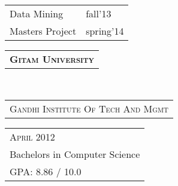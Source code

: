 \documentclass[10pt,a4paper,oneside]{article}
\begin{document}
\begin{minipage}[t]{0.33\textwidth}
\begin{adjustwidth}{7pt}{0pt}
\begin{tabular}{ll}
                { \footnotesize Data Mining } & {\footnotesize fall'13}\\
                { \footnotesize Masters Project } & {\footnotesize spring'14}
            \end{tabular}
        \end{adjustwidth}
        \vspace{10pt}
        \begin{tabular}{c}
            \textbf{\normalsize  G\textsc{itam} U\textsc{niversity}}
        \end{tabular}\\
        \textcolor{light-gray}{
            \begin{tabular}{l}
                {\small G\textsc{andhi} I\textsc{nstitute} O\textsc{f} T\textsc{ech} A\textsc{nd} M\textsc{gmt}}
            \end{tabular}
        } 
        \begin{tabular}{l}
            {\small A\textsc{pril} 2012}\\
            {\small Bachelors in Computer Science }\\
            {\small GPA: 8.86 / 10.0}
            \vspace{10pt}
        \end{tabular}\\
        \begin{comment}
        \textcolor{light-gray}{\textbf{\large S\textsc{kills}}}
        \vspace{-3pt}\\
        {\footnotesize
        \begin{tabular}{ll}
            \begin{tabular}{llll}\ &$\bullet$$\bullet$$\bullet$$\bullet$&$\bullet$$\bullet$$\bullet$$\bullet$&$\bullet$$\bullet$\\{\small
    \textbf{Languages}}&Java&Python&C++\end{tabular}\\[-0.2cm]
        \begin{tabular}{lll}\ &$\bullet$$\bullet$$\bullet$&$\bullet$$\bullet$\\{\small \textbf{Platforms}}&Amazon AWS&Google Cloud\end{tabular}\\[-0.2cm]
        \begin{tabular}{lll}\ &$\bullet$$\bullet$$\bullet$$\bullet$&$\bullet$$\bullet$$\bullet$$\bullet$\\{\small \textbf{OS}}&Linux&Windows\end{tabular}\\[-0.2cm]

\end{comment}
\end{minipage}
\end{document}
